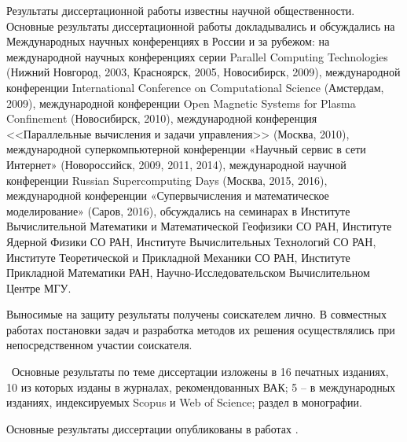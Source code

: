 {\probation}

Результаты диссертационной работы известны научной общественности. 
Основные результаты диссертационной работы докладывались и обсуждались на Международных научных конференциях в России и за рубежом: на международной научных конференциях серии Parallel Computing Technologies (Нижний Новгород, 2003, Красноярск, 2005, Новосибирск, 2009), международной конференции International Conference on Computational Science (Амстердам, 2009),  международной конференции Open Magnetic Systems for Plasma Confinement (Новосибирск, 2010), международной конференция <<Параллельные вычисления и задачи управления>> (Москва, 2010), международной суперкомпьютерной конференции  «Научный сервис в сети Интернет» (Новороссийск, 2009, 2011, 2014), международной научной конференции Russian Supercomputing Days (Москва, 2015, 2016), международной конференции «Супервычисления и математическое моделирование» (Саров, 2016), обсуждались на семинарах в Институте Вычислительной Математики и Математической Геофизики СО РАН, Институте Ядерной Физики СО РАН, Институте Вычислительных Технологий СО РАН, Институте Теоретической и Прикладной Механики СО РАН, Институте Прикладной Математики РАН, Научно-Исследовательском Вычислительном Центре МГУ.



{\contribution} Выносимые на защиту результаты получены соискателем лично. В совместных работах постановки задач и разработка методов их решения осуществлялись при непосредственном участии соискателя.


\publications\ Основные результаты по теме диссертации изложены в 16 печатных изданиях, 
10 из которых изданы в журналах, рекомендованных ВАК; 5 – в
международных изданиях, индексируемых Scopus и Web of Science; раздел в монографии.

Основные результаты диссертации опубликованы в работах \cite{MohographyTarkov,NNSU,multigridAuto,AutoParSilan,VychMetPlasma,Adaptive,NSU3D,vak3multi,MatMod,vakbib2,VychMethProgExa,SuperFrI,adaptCPC,LotovPoP,integrApproach,astroCoDesign}.



